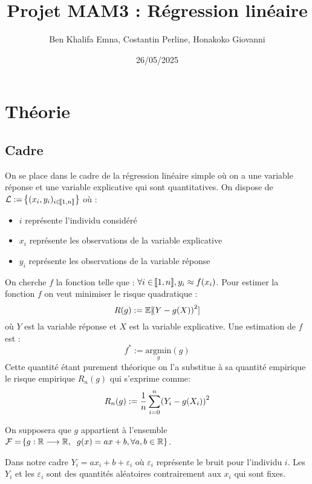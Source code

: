 \documentclass[12pt]{article}
\title{Projet MAM3 : Régression linéaire}
\author{Ben Khalifa Emna, Costantin Perline, Honakoko Giovanni}
\date{26/05/2025}
\newcommand{\acc}[1]{\hspace{-0.05cm}\left\{#1 \right\}}
\newcommand{\parr}[1]{\hspace{-0.05cm}\left(#1 \right)}
\newcommand{\braks}[1]{\hspace{-0.05cm}\llbracket#1 \rrbracket}
\newcommand{\mc}[1]{\mathcal{#1}}
\newcommand{\mb}[1]{\mathbb{#1}}
\newcommand{\lra}{\longrightarrow}
\begin{document}
	\maketitle

	\newpage
	\tableofcontents
	
	\section{Théorie}
	\subsection{Cadre}
	On se place dans le cadre de la régression linéaire simple où on a une variable réponse et une variable explicative qui sont quantitatives.
	On dispose de $\mc{L} := \acc{(x_{i},y_{i})_{i \in \braks{1,n}}}$ où :
	\begin{itemize}[label*=\textbullet]
		\item $i$ représente l'individu considéré 
		\item $x_{i}$ représente les observations de la variable explicative
		\item $y_{i}$ représente les observations de la variable réponse
	\end{itemize}
	On cherche $f$ la fonction telle que : $\forall i \in \braks{1,n}, y_i \approx f(x_i)$. Pour estimer la fonction $f$ on veut minimiser le risque quadratique : 
	\begin{equation*}
		R(g) := \mb{E}[\parr{Y- g(X)}^{2}]
	\end{equation*}
	où $Y$ est la variable réponse et $X$ est la variable explicative. 
	Une estimation de $f$ est :
	\begin{equation*}
		f^{*} := \underset{g}{\mathrm{argmin}}(g)
	\end{equation*}
	Cette quantité étant purement théorique on l'a substitue à sa quantité empirique le risque empirique $R_{n}(g)$ qui s'exprime comme: 
	\begin{equation*}
		R_{n}(g) := \dfrac{1}{n}\sum_{i=0}^{n}\parr{Y_{i} -g(X_i)}^{2}
	\end{equation*}
	
	On supposera que $g$ appartient à l'ensemble $\mc{F} = \acc{g : \mb{R}\lra \mb{R} , \hspace{2mm} g(x)= ax + b, \forall a,b \in \mathbb{R}}$.
	
	Dans notre cadre $Y_{i} = ax_{i}+ b + \varepsilon_{i}$ où $\varepsilon_i$ représente le bruit pour l'individu $i$. Les $Y_{i}$ et les $\varepsilon_{i}$ sont des quantités aléatoires contrairement aux $x_{i}$ qui sont fixes.
	
\end{document}
